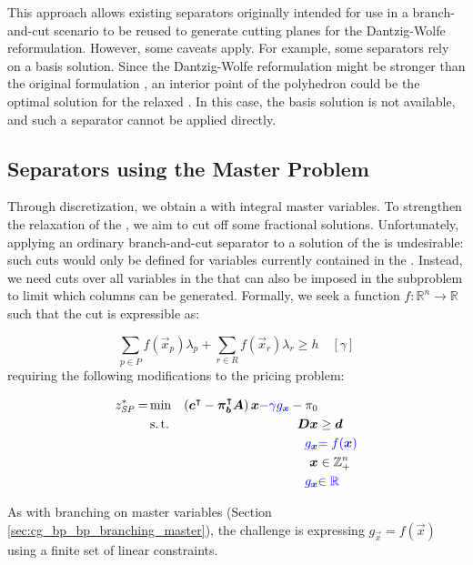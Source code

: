 This approach allows existing separators originally intended for use in a branch-and-cut scenario to be reused to generate cutting planes for the Dantzig-Wolfe reformulation. However, some caveats apply. For example, some separators rely on a basis solution. Since the Dantzig-Wolfe reformulation might be stronger than the original formulation \cite{thebook,bastubbe2018computational}, an interior point of the polyhedron could be the optimal solution for the relaxed \RMP{}. In this case, the basis solution is not available, and such a separator cannot be applied directly.

\subsection{Separators using the Master Problem}\label{sec:cg_bp_bpc_separators_master}
Through discretization, we obtain a \MP{} with integral master variables. To strengthen the \LP{} relaxation of the \MP{}, we aim to cut off some fractional solutions. Unfortunately, applying an ordinary branch-and-cut separator to a solution of the \RMP{} is undesirable: such cuts would only be defined for variables currently contained in the \RMP{}. Instead, we need cuts over all variables in the \MP{} that can also be imposed in the subproblem to limit which columns can be generated. Formally, we seek a function $f: \mathbb{R}^n \to \mathbb{R}$ such that the cut is expressible as:

\begin{equation}
\sum_{p \in \ddot{P}} f( \vec{x}_p ) \lambda_p + \sum_{r \in R} f(  \vec{x}_r ) \lambda_r \geq h \quad \left[ \gamma \right]
\end{equation}
requiring the following modifications to the pricing problem:

\begin{equation}
\begin{aligned}
z^*_\SP{} = &\min & \left( \vec{c}\transpose - \vec{\pi}_\vec{b}\transpose \mat{A} \right) \vec{x} {\color{blue} - \gamma g_\vec{x}} - \pi_0 & \\
&\st & \mat{D} \vec{x} & \geq \vec{d} \\
&& {\color{blue} g_\vec{x}} & {\color{blue} = f(\vec{x})} \\
&& \vec{x} & \in \mathbb{Z}_+^n \\
&& {\color{blue} g_\vec{x}} & {\color{blue} \in \mathbb{R}}
\end{aligned}
\end{equation}

As with branching on master variables (Section \ref{sec:cg_bp_bp_branching_master}), the challenge is expressing $g_\vec{x} = f(\vec{x})$ using a finite set of linear constraints.
